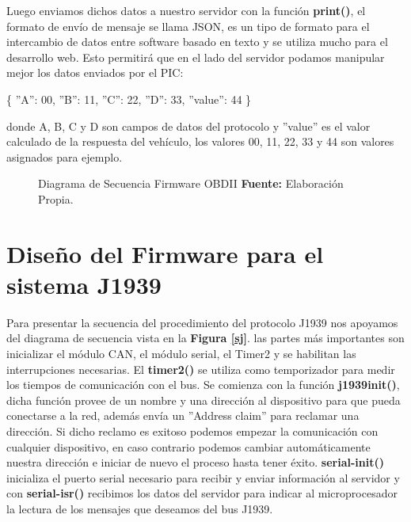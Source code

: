 Luego enviamos dichos datos a nuestro servidor con la función {\bfseries print()}, el formato de envío de mensaje se llama JSON, es un tipo de formato para el intercambio de datos entre software basado en texto y se utiliza mucho para el desarrollo web. Esto permitirá que en el lado del servidor podamos manipular mejor los datos enviados por el PIC: 

\{
	''A'':  00, 
	''B'': 11, 
	''C'': 22, 
	''D'': 33, 
	''value'': 44 \}

donde A, B, C y D son campos de datos del protocolo y ''value'' es el valor calculado de la respuesta del vehículo, los valores 00, 11, 22, 33 y 44 son valores asignados para ejemplo. 

 




\begin{figure}[H]
	\centering
	\begin{center}
		
	\end{center}
	\caption[Diagrama de Secuencia Firmware OBDII.]{Diagrama de Secuencia Firmware OBDII \textbf{ Fuente:} Elaboración Propia.}
	\label{sobd} %
\end{figure}



\section{Diseño del Firmware para el sistema J1939}
Para presentar la secuencia del procedimiento del protocolo J1939 nos apoyamos del diagrama de secuencia vista en la \textbf{Figura \ref{sj}}.
las partes más importantes son  inicializar el módulo CAN, el módulo serial, el Timer2 y se habilitan las interrupciones necesarias. 
El {\bfseries timer2()} se utiliza como temporizador para medir los tiempos de comunicación con el bus. 
Se comienza con la función {\bfseries j1939init()}, dicha función provee de un nombre y una dirección al dispositivo para que pueda conectarse a la red, además envía un ''Address claim'' para reclamar una dirección. Si dicho reclamo es exitoso podemos empezar la comunicación con cualquier dispositivo, en caso contrario podemos cambiar automáticamente nuestra dirección e iniciar de nuevo el proceso hasta tener éxito. {\bfseries serial-init()} inicializa el puerto serial necesario para recibir y enviar información al servidor y con {\bfseries serial-isr() } recibimos los datos del servidor para indicar al microprocesador la lectura de los mensajes que deseamos del bus J1939. 

